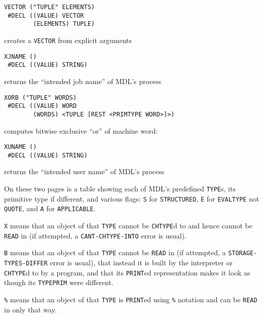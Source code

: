 \documentclass[a4paper]{scrbook}
\begin{document}
\begin{verbatim}
VECTOR ("TUPLE" ELEMENTS)
 #DECL ((VALUE) VECTOR
        (ELEMENTS) TUPLE)
\end{verbatim}

creates a \texttt{VECTOR} from explicit arguments

\begin{verbatim}
XJNAME ()
 #DECL ((VALUE) STRING)
\end{verbatim}

returns the ``intended job name'' of MDL's process

\begin{verbatim}
XORB ("TUPLE" WORDS)
 #DECL ((VALUE) WORD
        (WORDS) <TUPLE [REST <PRIMTYPE WORD>]>)
\end{verbatim}

computes bitwise exclusive ``or'' of machine word:

\begin{verbatim}
XUNAME ()
 #DECL ((VALUE) STRING)
\end{verbatim}

returns the ``intended user name'' of MDL's process

\label{appendix-3.-predefined-types}

On these two pages is a table showing each of MDL's predefined \texttt{TYPE}s, its primitive type if different, and various
flags: \texttt{S} for \texttt{STRUCTURED}, \texttt{E} for \texttt{EVALTYPE} not \texttt{QUOTE}, and \texttt{A} for
\texttt{APPLICABLE}.

\texttt{X} means that an object of that \texttt{TYPE} cannot be \texttt{CHTYPE}d to and hence cannot be \texttt{READ} in
(if attempted, a \texttt{CAN\textquotesingle{}T-CHTYPE-INTO} error is usual).

\texttt{B} means that an object of that \texttt{TYPE} cannot be \texttt{READ} in (if attempted, a
\texttt{STORAGE-TYPES-DIFFER} error is usual), that instead it is built by the interpreter or \texttt{CHTYPE}d to by a
program, and that its \texttt{PRINT}ed representation makes it look as though its \texttt{TYPEPRIM} were different.

\texttt{\%} means that an object of that \texttt{TYPE} is \texttt{PRINT}ed using \texttt{\%} notation and can be
\texttt{READ} in only that way.
\end{document}
